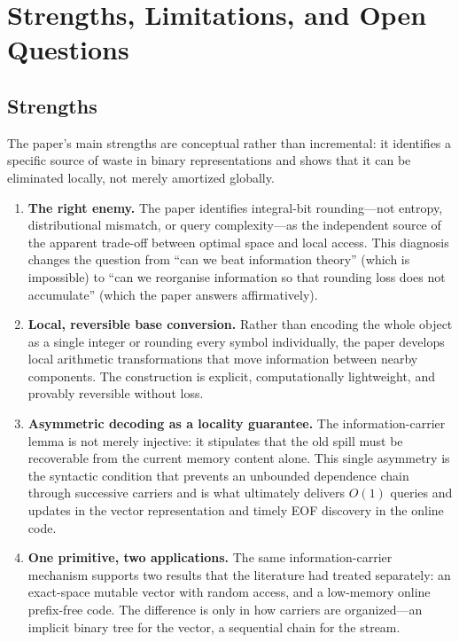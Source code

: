 \section{Strengths, Limitations, and Open Questions}
\label{sec:strengths-limitations}

\subsection{Strengths}

The paper's main strengths are conceptual rather than incremental: it
identifies a specific source of waste in binary representations and shows
that it can be eliminated locally, not merely amortized globally.

\begin{enumerate}[label=(\arabic*)]

\item \textbf{The right enemy.}
  The paper identifies integral-bit rounding---not entropy, distributional
  mismatch, or query complexity---as the independent source of the apparent
  trade-off between optimal space and local access.  This diagnosis changes
  the question from ``can we beat information theory'' (which is impossible)
  to ``can we reorganise information so that rounding loss does not
  accumulate'' (which the paper answers affirmatively).

\item \textbf{Local, reversible base conversion.}
  Rather than encoding the whole object as a single integer or rounding every
  symbol individually, the paper develops local arithmetic transformations
  that move information between nearby components.  The construction is
  explicit, computationally lightweight, and provably reversible without loss.

\item \textbf{Asymmetric decoding as a locality guarantee.}
  The information-carrier lemma is not merely injective: it stipulates that
  the old spill must be recoverable from the current memory content alone.
  This single asymmetry is the syntactic condition that prevents an unbounded
  dependence chain through successive carriers and is what ultimately delivers
  $O(1)$ queries and updates in the vector representation and timely EOF
  discovery in the online code.

\item \textbf{One primitive, two applications.}
  The same information-carrier mechanism supports two results that the
  literature had treated separately: an exact-space mutable vector with
  random access, and a low-memory online prefix-free code.  The difference is
  only in how carriers are organized---an implicit binary tree for the
  vector, a sequential chain for the stream.


\end{enumerate}
